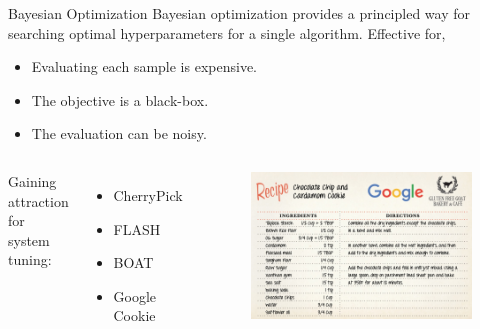 \begin{frame}{Bayesian Optimization}
  Bayesian optimization provides a principled way for searching optimal
  hyperparameters for a single algorithm. Effective for,

  \begin{itemize}
    \item Evaluating each sample is expensive.
    \item The objective is a black-box.
    \item The evaluation can be noisy.
  \end{itemize}

  \begin{columns}
    \footnotesize
    Gaining attraction for system tuning:

    \begin{itemize}
    \item CherryPick~\cite{alipourfard2017cherrypick}
    \item FLASH~\cite{zhang2016flash}
    \item BOAT~\cite{dalibard2017boat}
    \item Google Cookie~\cite{solnik2017bayesian}
    \end{itemize}
    \begin{figure}
      \includegraphics[width=\linewidth]{figures/google-cookie.jpg}
    \end{figure}
  \end{columns}

\end{frame}

